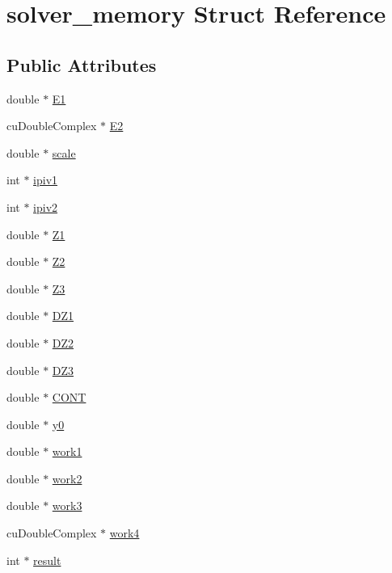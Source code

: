 \hypertarget{structsolver__memory}{}\section{solver\+\_\+memory Struct Reference}
\label{structsolver__memory}
\subsection*{Public Attributes}
\begin{DoxyCompactItemize}
\item 
double $\ast$ \hyperlink{structsolver__memory_a7824c82c506777035a208d517b3cfbd4}{E1}
\item 
cu\+Double\+Complex $\ast$ \hyperlink{structsolver__memory_a621540fabff6c08b742603bb8bac0fd0}{E2}
\item 
double $\ast$ \hyperlink{structsolver__memory_a29579f9ea0ff60e09652a35b3ff84113}{scale}
\item 
int $\ast$ \hyperlink{structsolver__memory_aa57a244e8903afaa7cb8be0efa6ca838}{ipiv1}
\item 
int $\ast$ \hyperlink{structsolver__memory_af7a33bfecc1bfbec0f7834facb72369e}{ipiv2}
\item 
double $\ast$ \hyperlink{structsolver__memory_aa494e688ee8d9516ffe48e4f26bb9455}{Z1}
\item 
double $\ast$ \hyperlink{structsolver__memory_a2450435b9370ebf22d87f51f7b18c629}{Z2}
\item 
double $\ast$ \hyperlink{structsolver__memory_a3f13b379ba1ecb183bf9f22c2ef3f23c}{Z3}
\item 
double $\ast$ \hyperlink{structsolver__memory_a298b97442915b9fd35c634ea519cb07c}{D\+Z1}
\item 
double $\ast$ \hyperlink{structsolver__memory_aa5d1338448423480b4074926794433f9}{D\+Z2}
\item 
double $\ast$ \hyperlink{structsolver__memory_ab2a8855e36cb6a07cf023f0202fb52ef}{D\+Z3}
\item 
double $\ast$ \hyperlink{structsolver__memory_a6e5e4e493505010035b690ea30d49242}{C\+O\+NT}
\item 
double $\ast$ \hyperlink{structsolver__memory_a8837c70538f1410e79b4a125549cfa2e}{y0}
\item 
double $\ast$ \hyperlink{structsolver__memory_a57f447c07f363c462e91716393df0b3c}{work1}
\item 
double $\ast$ \hyperlink{structsolver__memory_a8f8a7539530bd566a5c241c5a9a5930a}{work2}
\item 
double $\ast$ \hyperlink{structsolver__memory_a5f1625152446318c7489bb9a0eaadf02}{work3}
\item 
cu\+Double\+Complex $\ast$ \hyperlink{structsolver__memory_a2d1926f048b79b2a7cffc29dc5db187d}{work4}
\item 
int $\ast$ \hyperlink{structsolver__memory_a874434e5cded842c4961f3f05bbf6759}{result}
\end{DoxyCompactItemize}



